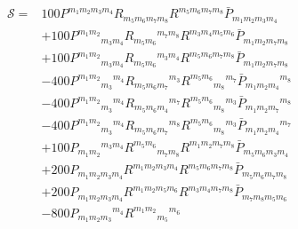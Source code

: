 \newcommand{\Pbar}{\bar{P}}
\begin{align}
\mathcal{S}  =  
& 100 P^{{m_{1}} {m_{2}} {m_{3}} {m_{4}}}
       R_{{m_{5}} {m_{6}} {m_{7}} {m_{8}}}
       R^{{m_{5}} {m_{6}} {m_{7}} {m_{8}}}
       \Pbar_{{m_{1}} {m_{2}} {m_{3}} {m_{4}}}
  \tag{T1}\label{T1}\\[3pt]
&+100 P^{{m_{1}} {m_{2}}}\!_{{m_{3}} {m_{4}}}
       R_{{m_{5}} {m_{6}}}\!^{{m_{7}} {m_{8}}}
       R^{{m_{3}} {m_{4}} {m_{5}} {m_{6}}}
       \Pbar_{{m_{1}} {m_{2}} {m_{7}} {m_{8}}}
  \tag{T2}\label{T2}\\[3pt]
&+100 P^{{m_{1}} {m_{2}}}\!_{{m_{3}} {m_{4}}}
       R_{{m_{5}} {m_{6}}}\!^{{m_{3}} {m_{4}}}
       R^{{m_{5}} {m_{6}} {m_{7}} {m_{8}}}
       \Pbar_{{m_{1}} {m_{2}} {m_{7}} {m_{8}}}
  \tag{T3}\label{T3}\\[3pt]
&-400 P^{{m_{1}} {m_{2}}}\!_{{m_{3}}}\!^{{m_{4}}}
       R_{{m_{5}} {m_{6}} {m_{7}}}\!^{{m_{3}}}
       R^{{m_{5}} {m_{6}}}\!_{{m_{8}}}\!^{{m_{7}}}
       \Pbar_{{m_{1}} {m_{2}} {m_{4}}}\!^{{m_{8}}}
  \tag{T4}\label{T4}\\[3pt]
&-400 P^{{m_{1}} {m_{2}}}\!_{{m_{3}}}\!^{{m_{4}}}
       R_{{m_{5}} {m_{6}} {m_{4}}}\!^{{m_{7}}}
       R^{{m_{5}} {m_{6}}}\!_{{m_{8}}}\!^{{m_{3}}}
       \Pbar_{{m_{1}} {m_{2}} {m_{7}}}\!^{{m_{8}}}
  \tag{T5}\label{T5}\\[3pt]
&-400 P^{{m_{1}} {m_{2}}}\!_{{m_{3}}}\!^{{m_{4}}}
       R_{{m_{5}} {m_{6}} {m_{7}}}\!^{{m_{8}}}
       R^{{m_{5}} {m_{6}}}\!_{{m_{8}}}\!^{{m_{3}}}
       \Pbar_{{m_{1}} {m_{2}} {m_{4}}}\!^{{m_{7}}}
  \tag{T6}\label{T6}\\[3pt]
&+100 P_{{m_{1}} {m_{2}}}\!^{{m_{3}} {m_{4}}}
       R^{{m_{5}} {m_{6}}}\!_{{m_{7}} {m_{8}}}
       R^{{m_{1}} {m_{2}} {m_{7}} {m_{8}}}
       \Pbar_{{m_{5}} {m_{6}} {m_{3}} {m_{4}}}
  \tag{T7}\label{T7}\\[3pt]
&+200 P_{{m_{1}} {m_{2}} {m_{3}} {m_{4}}}
       R^{{m_{1}} {m_{2}} {m_{3}} {m_{4}}}
       R^{{m_{5}} {m_{6}} {m_{7}} {m_{8}}}
       \Pbar_{{m_{5}} {m_{6}} {m_{7}} {m_{8}}}
  \tag{T8}\label{T8}\\[3pt]
&+200 P_{{m_{1}} {m_{2}} {m_{3}} {m_{4}}}
       R^{{m_{1}} {m_{2}} {m_{5}} {m_{6}}}
       R^{{m_{3}} {m_{4}} {m_{7}} {m_{8}}}
       \Pbar_{{m_{7}} {m_{8}} {m_{5}} {m_{6}}}
  \tag{T9}\label{T9}\\[3pt]
&-800 P_{{m_{1}} {m_{2}} {m_{3}}}\!^{{m_{4}}}
       R^{{m_{1}} {m_{2}}}\!_{{m_{5}}}\!^{{m_{6}}}

\end{align}
